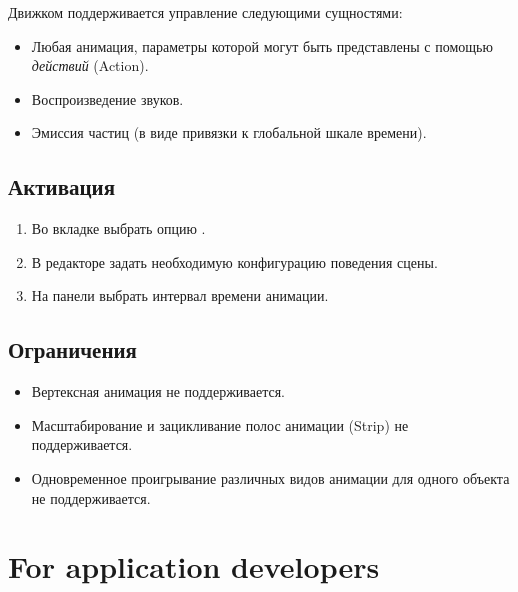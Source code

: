 \documentclass[a4paper,12pt,oneside]{sphinxmanual}
\begin{document}
Движком поддерживается управление следующими сущностями:
\begin{itemize}
\item {} 
Любая анимация, параметры которой могут быть представлены с помощью \emph{действий} (Action).

\item {} 
Воспроизведение звуков.

\item {} 
Эмиссия частиц (в виде привязки к глобальной шкале времени).

\end{itemize}


\section{Активация}
\label{nla:id2}\begin{enumerate}
\item {} 
Во вкладке  выбрать опцию .

\item {} 
В редакторе  задать необходимую конфигурацию поведения сцены.

\item {} 
На панели  выбрать интервал времени анимации.

\end{enumerate}


\section{Ограничения}
\label{nla:id3}\begin{itemize}
\item {} 
Вертексная анимация не поддерживается.

\item {} 
Масштабирование и зацикливание полос анимации (Strip) не поддерживается.

\item {} 
Одновременное проигрывание различных видов анимации для одного объекта не поддерживается.

\end{itemize}


\chapter{For application developers}
\label{developers:developers}\label{developers::doc}\label{developers:id1}
\end{document}
